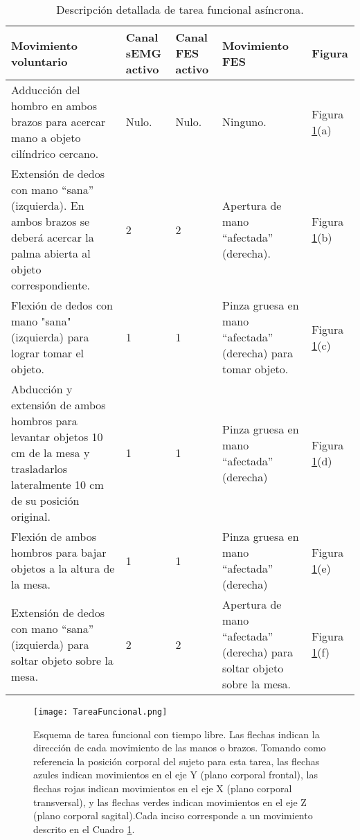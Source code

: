 \begin{table}[htbp]
	\centering
	\begin{tabular}{|p{5cm}|p{1.4cm}|p{1.4cm}|p{3.5cm}|p{1.5cm}|}
	\hline
	\textbf{Movimiento voluntario} & \textbf{Canal sEMG activo} & \textbf{Canal FES activo} & \textbf{Movimiento FES} & \textbf{Figura}\\ \hline \hline
	Adducción del hombro en ambos brazos para acercar mano a objeto cilíndrico cercano. & Nulo. & Nulo. & Ninguno. & Figura \ref{Figura: TareaFuncional_P}(a)\\ \hline
	Extensión de dedos con mano ``sana'' (izquierda). En ambos brazos se deberá acercar la palma abierta al objeto correspondiente. & 2 & 2 & Apertura de mano ``afectada'' (derecha). & Figura \ref{Figura: TareaFuncional_P}(b)\\ \hline
	Flexión de dedos con mano "sana" (izquierda) para lograr tomar el objeto. & 1 & 1 & Pinza gruesa en mano ``afectada'' (derecha) para tomar objeto. & Figura \ref{Figura: TareaFuncional_P}(c)\\ \hline
	Abducción y extensión de ambos hombros para levantar objetos 10 cm de la mesa y trasladarlos lateralmente 10 cm de su posición original. & 1 & 1 & Pinza gruesa en mano ``afectada'' (derecha) & Figura \ref{Figura: TareaFuncional_P}(d)\\ \hline
	Flexión de ambos hombros para bajar objetos a la altura de la mesa. & 1 & 1 & Pinza gruesa en mano ``afectada'' (derecha) & Figura \ref{Figura: TareaFuncional_P}(e)\\ \hline
	Extensión de dedos con mano ``sana'' (izquierda) para soltar objeto sobre la mesa. & 2 & 2 & Apertura de mano ``afectada'' (derecha) para soltar objeto sobre la mesa. & Figura \ref{Figura: TareaFuncional_P}(f)\\ \hline
	\end{tabular}
	\caption{Descripción detallada de tarea funcional asíncrona.}
	\label{Cuadro:TareaFunAsin}
\end{table}

\begin{figure}[htbp]
	\centering
	\texttt{[image: TareaFuncional.png]}
	\caption[Esquema de tarea funcional con tiempo libre.]{Esquema de tarea funcional con tiempo libre. Las flechas indican la dirección de cada movimiento de las manos o brazos. Tomando como referencia la posición corporal del sujeto para esta tarea, las flechas azules indican movimientos en el eje Y (plano corporal frontal), las flechas rojas indican movimientos en el eje X (plano corporal transversal), y las flechas verdes indican movimientos en el eje Z (plano corporal sagital).Cada inciso corresponde a un movimiento descrito en el Cuadro \ref{Cuadro:TareaFunAsin}.}
	\label{Figura: TareaFuncional_P}
\end{figure}



